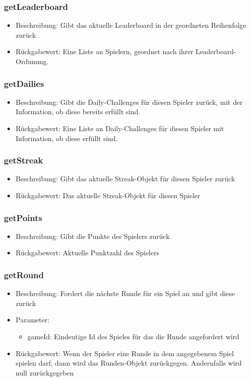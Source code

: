\documentclass[a4paper]{scrreprt}
\begin{document}
	\subsubsection{getLeaderboard}
	\begin{itemize}
		\item Beschreibung: Gibt das aktuelle Leaderboard in der geordneten Reihenfolge zurück
		\item Rückgabewert: Eine Liste an Spielern, geordnet nach ihrer Leaderboard-Ordunung.
	\end{itemize}
	\subsubsection{getDailies}
	\begin{itemize}
		\item Beschreibung: Gibt die Daily-Challenges für diesen Spieler zurück, mit der Information, ob diese bereits erfüllt sind.
		\item Rückgabewert: Eine Liste an Daily-Challenges für diesen Spieler mit Information, ob diese erfüllt sind.
	\end{itemize}
	\subsubsection{getStreak}
	\begin{itemize}
		\item Beschreibung: Gibt das aktuelle Streak-Objekt für diesen Spieler zurück
		\item Rückgabewert: Das aktuelle Streak-Objekt für diesen Spieler
	\end{itemize}
	\subsubsection{getPoints}
	\begin{itemize}
		\item Beschreibung: Gibt die Punkte des Spielers zurück
		\item Rückgabewert: Aktuelle Punktzahl des Spielers
	\end{itemize}
	\subsubsection{getRound}
	\begin{itemize}
		\item Beschreibung: Fordert die nächste Runde für ein Spiel an und gibt diese zurück
		\item Parameter:
		\begin{itemize}
			\item gameId: Eindeutige Id des Spieles für das die Runde angefordert wird
		\end{itemize}
		\item Rückgabewert: Wenn der Spieler eine Runde in dem angegebenem Spiel spielen darf, dann wird das Runden-Objekt zurückgegen. Andernfalls wird null zurückgegeben
	\end{itemize}
\end{document}
